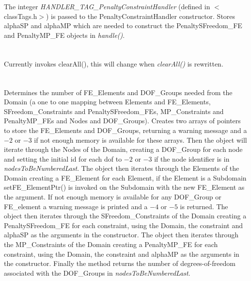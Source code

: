  \\
\\ 
The integer {\em HANDLER\_TAG\_PenaltyConstraintHandler} (defined in
$<$classTags.h$>$) is passed to the PenaltyConstraintHandler
constructor. Stores \p alphaSP and \p alphaMP which are needed
to construct the PenaltySFreedom\_FE and PenaltyMP\_FE objects in {\em
handle()}. \\

 \\
\\ 
Currently invokes clearAll(), this will change when {\em
clearAll()} is rewritten. \\

\\
 \\
Determines the number of FE\_Elements and DOF\_Groups needed from the
Domain (a one to one mapping between Elements and FE\_Elements,
SFreedom\_Constraints and PenaltySFreedom\_FEs, MP\_Constraints and PenaltyMP\_FEs and
Nodes and DOF\_Groups). Creates two arrays of pointers to store the
FE\_Elements and DOF\_Groups, returning a warning message and a $-2$
or $-3$ if not enough memory is available for these arrays. Then the
object will iterate through the Nodes of the Domain, creating a
DOF\_Group for each node and setting the initial id for each dof to
$-2$ or $-3$ if the node identifier is in {\em
nodesToBeNumberedLast}. The object then iterates through the Elements
of the Domain creating a FE\_Element for each Element, if the Element
is a Subdomain setFE\_ElementPtr() is invoked on the Subdomain
with the new FE\_Element as the argument. If not enough memory is
available for any DOF\_Group or FE\_element a warning message is
printed and a $-4$ or $-5$ is returned. 
The object then iterates through the SFreedom\_Constraints
of the Domain creating a PenaltySFreedom\_FE for each constraint, using the
Domain, the constraint and \p alphaSP as the arguments in the
constructor.
The object then iterates through the MP\_Constraints
of the Domain creating a PenaltyMP\_FE for each constraint, using the
Domain, the constraint and \p alphaMP as the arguments in the constructor.
Finally the method returns the
number of degrees-of-freedom associated with the DOF\_Groups in {\em
nodesToBeNumberedLast}. \\

